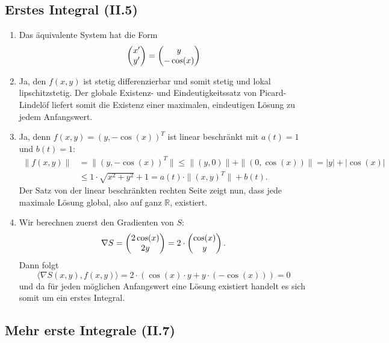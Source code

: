 \documentclass[a4paper]{article}
\begin{document}
\makeexheader

\subsection{Erstes Integral (II.5)}

\begin{enumerate}[label=(\alph*)]
    \item Das äquivalente System hat die Form
    \begin{equation*}
        \left(\begin{matrix}x' \\ y'\end{matrix}\right) = \left(\begin{matrix}y \\ -\cos(x)\end{matrix}\right)
    \end{equation*}
    \item Ja, den $f(x,y)$ ist stetig differenzierbar und somit stetig und lokal lipschitzstetig. Der globale Existenz- und Eindeutigkeitssatz von Picard-Lindelöf liefert somit die Existenz einer maximalen, eindeutigen Lösung zu jedem Anfangswert.
    \item Ja, denn $f(x,y) = (y, -\cos(x))^T$ ist linear beschränkt mit $a(t) = 1$ und $b(t) = 1$:
    \begin{align*}
        \|f(x,y)\| &= \|(y, -\cos(x))^T\| \leq \| (y,0) \| + \|(0, \cos(x))\| = |y| + |\cos(x)|\\ &\leq 1 \cdot \sqrt{x^2 + y^2} + 1 = a(t) \cdot \|(x,y)^T\| + b(t)\text{.}
    \end{align*}
    Der Satz von der linear beschränkten rechten Seite zeigt nun, dass jede maximale Lösung global, also auf ganz $\mathds{R}$, existiert.
    \item Wir berechnen zuerst den Gradienten von $S$:
    \begin{equation*}
        \nabla S = \left(\begin{matrix}2 \cos (x) \\ 2 y\end{matrix}\right) = 2 \cdot \left(\begin{matrix}\cos(x) \\ y\end{matrix}\right)\text{.}
    \end{equation*}
    Dann folgt
    \begin{equation*}
        \langle \nabla S(x,y), f(x,y) \rangle = 2 \cdot (\cos(x) \cdot y + y \cdot (-\cos(x))) = 0
    \end{equation*}
    und da für jeden möglichen Anfangswert eine Lösung existiert handelt es sich somit um ein erstes Integral.
\end{enumerate}

\subsection{Mehr erste Integrale (II.7)}
\end{document}
